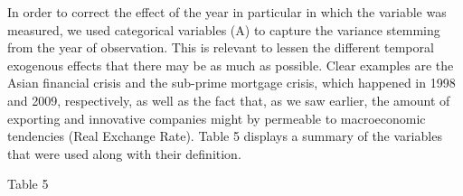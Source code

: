 In order to correct the effect of the year in particular in which the variable was measured, we used categorical variables (A) to capture the variance stemming from the year of observation. This is relevant to lessen the different temporal exogenous effects that there may be as much as possible. Clear examples are the Asian financial crisis and the sub-prime mortgage crisis, which happened in 1998 and 2009, respectively, as well as the fact that, as we saw earlier, the amount of exporting and innovative companies might by permeable to macroeconomic tendencies (Real Exchange Rate). Table 5 displays a summary of the variables that were used along with their definition.

Table 5